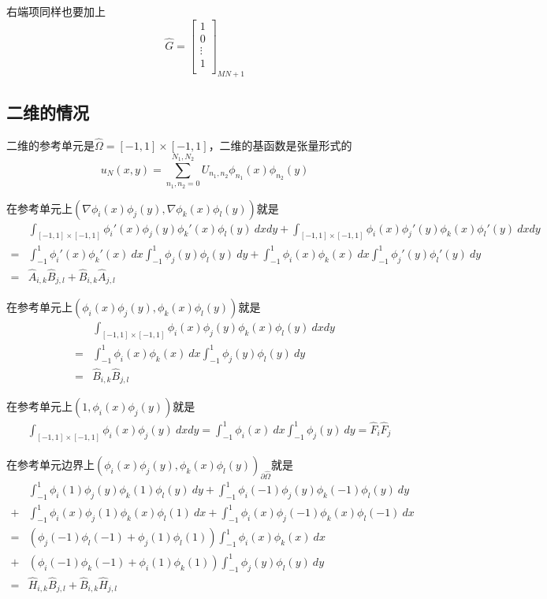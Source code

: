 \documentclass[UTF8,12pt]{article}
\begin{document}
右端项同样也要加上
\begin{equation}
\hat{G} = \left[ \begin{array}{c}
1 \\
0 \\
\vdots \\
1 \\
\end{array} \right]_{MN+1}
\end{equation}

\subsection{二维的情况}

二维的参考单元是$\hat{\Omega} = [-1,1] \times [-1,1]$，二维的基函数是张量形式的
$$ u_N(x,y) = \sum_{n_1,n_2 = 0}^{N_1, N_2} U_{n_1,n_2} \phi_{n_1}(x) \phi_{n_2}(y) $$

在参考单元上$(\nabla \phi_i(x) \phi_j(y), \nabla \phi_k(x) \phi_l(y))$就是
\begin{align*}
& \int_{[-1,1] \times [-1,1]} \phi_i'(x) \phi_j(y) \phi_k'(x) \phi_l(y) \ dx dy + \int_{[-1,1] \times [-1,1]} \phi_i(x) \phi_j'(y) \phi_k(x) \phi_l'(y) \ dx dy \\
= & \int_{-1}^{1} \phi_i'(x) \phi_k'(x) \ dx \int_{-1}^{1} \phi_j(y) \phi_l(y) \ dy + \int_{-1}^{1} \phi_i(x) \phi_k(x) \ dx \int_{-1}^{1} \phi_j'(y) \phi_l'(y) \ dy \\
= & \hat{A}_{i,k} \hat{B}_{j,l} + \hat{B}_{i,k} \hat{A}_{j,l}
\end{align*}

在参考单元上$(\phi_i(x) \phi_j(y), \phi_k(x) \phi_l(y))$就是
\begin{align*}
& \int_{[-1,1] \times [-1,1]} \phi_i(x) \phi_j(y) \phi_k(x) \phi_l(y) \ dx dy \\
= & \int_{-1}^{1} \phi_i(x) \phi_k(x) \ dx \int_{-1}^{1} \phi_j(y) \phi_l(y) \ dy \\
= & \hat{B}_{i,k} \hat{B}_{j,l}
\end{align*}

在参考单元上$(1, \phi_i(x) \phi_j(y))$就是
\begin{align*}
& \int_{[-1,1] \times [-1,1]} \phi_i(x) \phi_j(y) \ dx dy = \int_{-1}^{1} \phi_i(x) \ dx \int_{-1}^{1} \phi_j(y) \ dy = \hat{F}_{i} \hat{F}_{j}
\end{align*}

在参考单元边界上$(\phi_i(x) \phi_j(y), \phi_k(x) \phi_l(y))_{\partial \hat{\Omega}}$就是
\begin{align*}
& \int_{-1}^{1} \phi_i(1) \phi_j(y) \phi_k(1) \phi_l(y) \ dy + \int_{-1}^{1} \phi_i(-1) \phi_j(y) \phi_k(-1) \phi_l(y) \ dy \\
+ & \int_{-1}^{1} \phi_i(x) \phi_j(1) \phi_k(x) \phi_l(1) \ dx + \int_{-1}^{1} \phi_i(x) \phi_j(-1) \phi_k(x) \phi_l(-1) \ dx \\
= & (\phi_j(-1) \phi_l(-1) + \phi_j(1) \phi_l(1)) \int_{-1}^{1} \phi_i(x) \phi_k(x) \ dx \\
+ & (\phi_i(-1) \phi_k(-1) + \phi_i(1) \phi_k(1)) \int_{-1}^{1} \phi_j(y) \phi_l(y) \ dy \\
= & \hat{H}_{i,k} \hat{B}_{j,l} + \hat{B}_{i,k} \hat{H}_{j,l}
\end{align*}
\end{document}
